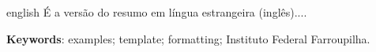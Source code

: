 \begin{resumo}[Abstract]			%
\begin{otherlanguage*}{english}		%
É a versão do resumo em língua estrangeira (inglês).... 

\vspace{\onelineskip}
\noindent

\textbf{Keywords}: examples; template; formatting; Instituto Federal Farroupilha.
\end{otherlanguage*}
\end{resumo}